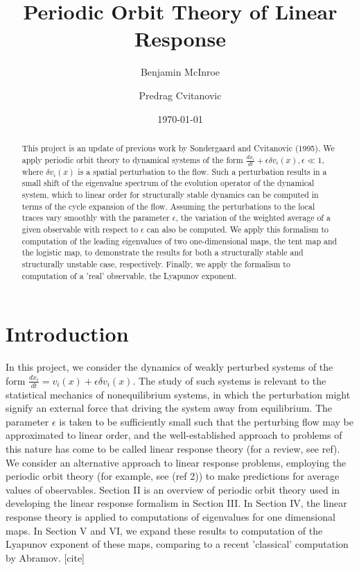 \documentclass[pre,aps,twocolumn,showpacs,hyperref]{revtex4-1} %
\begin{document}
\title{Periodic Orbit Theory of Linear Response}
\author{Benjamin McInroe}
\author{Predrag Cvitanovic}

\date{\today}

\begin{abstract}

This project is an update of previous work by Sondergaard and Cvitanovic (1995). We apply periodic orbit theory to dynamical systems of the form $\frac{dx_{i}}{dt}+\epsilon \delta v_{i}(x), \epsilon \ll 1$, where $\delta v_{i}(x)$ is a spatial perturbation to the flow. Such a perturbation results in a small shift of the eigenvalue spectrum of the evolution operator of the dynamical system, which to linear order for structurally stable dynamics can be computed in terms of the cycle expansion of the flow. Assuming the perturbations to the local traces vary smoothly with the parameter $\epsilon$, the variation of the weighted average of a given observable with respect to $\epsilon$ can also be computed. We apply this formalism to computation of the leading eigenvalues of two one-dimensional maps, the tent map and the logistic map, to demonstrate the results for both a structurally stable and structurally unstable case, respectively. Finally, we apply the formalism to computation of a 'real' observable, the Lyapunov exponent.

\end{abstract}

\maketitle



\section{Introduction}

In this project, we consider the dynamics of weakly perturbed systems of the form $\frac{dx_{i}}{dt}=v_{i}(x) + \epsilon \delta v_{i}(x)$. The study of such systems is relevant to the statistical mechanics of nonequilibrium systems, in which the perturbation might signify an external force that driving the system away from equilibrium. The parameter $\epsilon$ is taken to be sufficiently small such that the perturbing flow may be approximated to linear order, and the well-established approach to problems of this nature has come to be called linear response theory (for a review, see ref). We consider an alternative approach to linear response problems, employing the periodic orbit theory (for example, see (ref 2)) to make predictions for average values of observables.  Section II is an overview of periodic orbit theory used in developing the linear response formalism in Section III. In Section IV, the linear response theory is applied to computations of eigenvalues for one dimensional maps. In Section V and VI, we expand these results to computation of the Lyapunov exponent of these maps, comparing to a recent 'classical' computation by Abramov. [cite]
\end{document}
